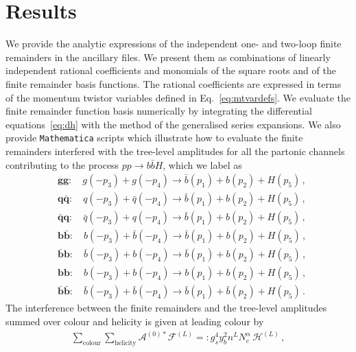 \documentclass[main.tex]{subfiles}
\begin{document}
\section{Results}
\label{Hbbsec:results}

We provide the analytic expressions of the independent one- and two-loop finite remainders in the ancillary files. We present them as combinations of linearly independent rational coefficients and monomials of the square roots and of the finite remainder basis functions. The rational coefficients are expressed in terms of the momentum twistor variables defined in Eq.~\eqref{eq:mtvardefs}. We evaluate the finite remainder function basis numerically by integrating the differential equations~\eqref{eq:dh} with the method of the generalised series expansions. We also provide \texttt{Mathematica} scripts which illustrate how to evaluate the finite remainders interfered with the tree-level amplitudes for all the partonic channels contributing to the process $pp\to b\bar{b} H$, which we label as
\begin{equation}
\label{eq:channel_definition}
\begin{aligned}
&\mathbf{gg}:       \quad  g(-p_3) + g(-p_4) \rightarrow \bar{b}(p_1) + b(p_2) + H(p_5) \,, \\
&\mathbf{q\bar{q}}: \quad  q(-p_3) + \bar{q}(-p_4) \rightarrow \bar{b}(p_1) + b(p_2) + H(p_5) \,, \\
&\mathbf{\bar{q}q}: \quad \bar{q}(-p_3) + q(-p_4) \rightarrow \bar{b}(p_1) + b(p_2) + H(p_5) \,, \\
&\mathbf{b\bar{b}}: \quad b(-p_3) + \bar{b}(-p_4) \rightarrow \bar{b}(p_1) + b(p_2) + H(p_5) \,, \\
&\mathbf{\bar{b}b}: \quad \bar{b}(-p_3) + b(-p_4) \rightarrow \bar{b}(p_1) + b(p_2) + H(p_5) \,, \\
&\mathbf{bb}: \quad b(-p_3) + b(-p_4) \rightarrow b(p_1) + b(p_2) + H(p_5) \,, \\
&\mathbf{\bar{b}\bar{b}}: \quad \bar{b}(-p_3) + \bar{b}(-p_4) \rightarrow \bar{b}(p_1) + \bar{b}(p_2) + H(p_5) \,.
\end{aligned}
\end{equation}
The interference between the finite remainders and the tree-level amplitudes summed over colour and helicity is given at leading colour by 
\begin{align}
\sum_{\text{colour}} \sum_{\text{helicity}} \mathcal{A}^{(0) *} \mathcal{F}^{(L)} =: g_s^4 y_b^2 n^L N_c^{\alpha} \, \mathcal{H}^{(L)}\,,
\end{align}
\end{document}
